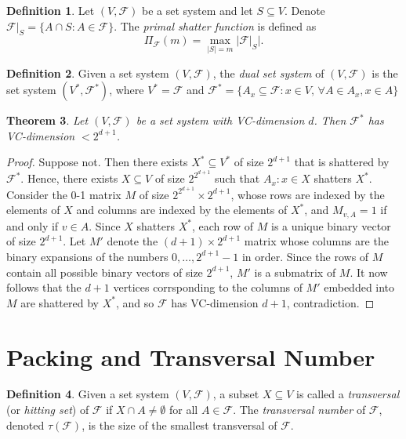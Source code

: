 \documentclass[12pt,reqno]{amsart}
\newtheorem{theorem}{Theorem}[section]
\theoremstyle{definition}
\newtheorem{definition}[theorem]{Definition}
\theoremstyle{remark}
\def\F{\mathcal{F}}
\numberwithin{equation}{section}
\begin{document}
\begin{definition}
	Let $(V, \F)$ be a set system and let $S \subseteq V$. Denote $\F|_S = \{A \cap S : A \in \F\}$. The \textit{primal shatter function} is defined as
	\[
		\Pi_\F(m) = \max_{|S| = m} |\F|_S|.
	\]
\end{definition}

\begin{definition}
	Given a set system $(V, \F)$, the \textit{dual set system} of $(V, \F)$ is the set system $(V^*, \F^*)$, where $V^* = \F$ and $\F^* = \{A_x \subseteq \F : x \in V, \, \forall A \in A_x, x \in A\}$
\end{definition}

\begin{theorem}\label{thm:dual-vc}
	Let $(V, \F)$ be a set system with VC-dimension $d$. Then $\F^*$ has VC-dimension $< 2^{d + 1}$.
\end{theorem}

\begin{proof}
	Suppose not. Then there exists $X^* \subseteq V^*$ of size $2^{d + 1}$ that is shattered by $\F^*$. Hence, there exists $X \subseteq V$ of size $2^{2^{d + 1}}$ such that $A_x : x \in X$ shatters $X^*$. Consider the 0-1 matrix $M$ of size $2^{2^{d + 1}} \times 2^{d + 1}$, whose rows are indexed by the elements of $X$ and columns are indexed by the elements of $X^*$, and $M_{v, A} = 1$ if and only if $v  \in A$. Since $X$ shatters $X^*$, each row of $M$ is a unique binary vector of size $2^{d + 1}$. Let $M'$ denote the $(d + 1) \times 2^{d + 1}$ matrix whose columns are the binary expansions of the numbers $0, \ldots, 2^{d + 1} - 1$ in order. Since the rows of $M$ contain all possible binary vectors of size $2^{d + 1}$, $M'$ is a submatrix of $M$. It now follows that the $d + 1$ vertices corrsponding to the columns of $M'$ embedded into $M$ are shattered by $X^*$, and so $\F$ has VC-dimension $d + 1$, contradiction.
\end{proof}

\newpage

\section{Packing and Transversal Number}

\begin{definition}
	Given a set system $(V, \F)$, a subset $X \subseteq V$ is called a \textit{transversal} (or \textit{hitting set}) of $\F$ if $X \cap A \neq \emptyset$ for all $A \in \F$. The \textit{transversal number} of $\F$, denoted $\tau(\F)$, is the size of the smallest transversal of $\F$.
\end{definition}
\end{document}
